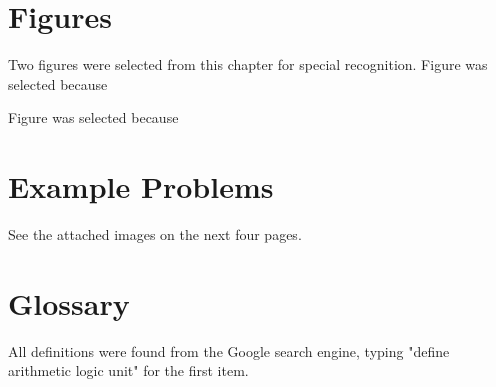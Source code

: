 \documentclass[12pt]{article}
\numberwithin{figure}{subsection}
\numberwithin{table}{subsection}
\numberwithin{equation}{subsection}
\begin{document}
\section{Figures}

Two figures were selected from this chapter for special recognition. Figure was selected because


Figure was selected because


\section{Example Problems}

See the attached images on the next four pages.

% 

\section{Glossary}

All definitions were found from the Google search engine, typing "define arithmetic logic unit" for the first item.
\end{document}
